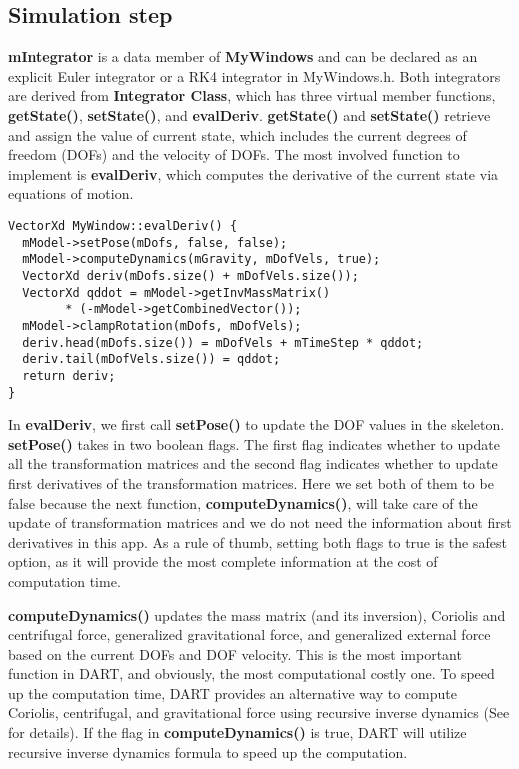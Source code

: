 \subsection{Simulation step}
\textbf{mIntegrator} is a data member of \textbf{MyWindows} and can be
declared as an explicit Euler integrator or a RK4 integrator in
MyWindows.h. Both integrators are derived from \textbf{Integrator
  Class}, which has three virtual member functions,
\textbf{getState()}, \textbf{setState()}, and
\textbf{evalDeriv}. \textbf{getState()} and \textbf{setState()}
retrieve and assign the value of current state, which includes the
current degrees of freedom (DOFs) and the velocity of DOFs. The most
involved function to implement is \textbf{evalDeriv}, which computes
the derivative of the current state via equations of motion.

\ttfamily
\begin{lstlisting}[label=evalDeriv,caption=evalDeriv]
VectorXd MyWindow::evalDeriv() {
  mModel->setPose(mDofs, false, false);
  mModel->computeDynamics(mGravity, mDofVels, true);
  VectorXd deriv(mDofs.size() + mDofVels.size());
  VectorXd qddot = mModel->getInvMassMatrix() 
        * (-mModel->getCombinedVector());
  mModel->clampRotation(mDofs, mDofVels);
  deriv.head(mDofs.size()) = mDofVels + mTimeStep * qddot;
  deriv.tail(mDofVels.size()) = qddot;
  return deriv;
}
\end{lstlisting}
\rmfamily
In \textbf{evalDeriv}, we first call \textbf{setPose()} to update the
DOF values in the skeleton. \textbf{setPose()} takes in two boolean
flags. The first flag indicates whether to update all the
transformation matrices and the second flag indicates whether to
update first derivatives of the transformation matrices. Here we set
both of them to be false because the next function, 
\textbf{computeDynamics()}, will take care of the update of
transformation matrices and we do not need the information about first
derivatives in this app. As a rule of thumb, setting both flags to
true is the safest option, as it will provide the most complete
information at the cost of computation time.

\textbf{computeDynamics()} updates the mass matrix (and its
inversion), Coriolis and centrifugal force, generalized gravitational force,
and generalized external force based on the current DOFs and DOF
velocity. This is the most important function in DART, and obviously,
the most computational costly one. To speed up the computation time,
DART provides an alternative way to compute Coriolis, centrifugal, and
gravitational force using recursive inverse dynamics (See
\cite{dynamics-tutorial} for details). If the flag in
\textbf{computeDynamics()} is true, DART will utilize recursive
inverse dynamics formula to speed up the computation.

